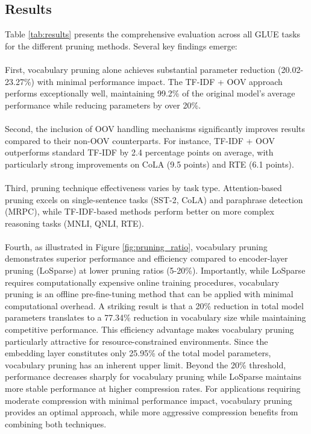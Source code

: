 \documentclass[twocolumn]{article}
\begin{document}
\subsection{Results}
Table \ref{tab:results} presents the comprehensive evaluation across all GLUE tasks for the different pruning methods. Several key findings emerge:
\\ \\
First, vocabulary pruning alone achieves substantial parameter reduction (20.02-23.27\%) with minimal performance impact. The TF-IDF + OOV approach performs exceptionally well, maintaining 99.2\% of the original model's average performance while reducing parameters by over 20\%.
\\ \\
Second, the inclusion of OOV handling mechanisms significantly improves results compared to their non-OOV counterparts. For instance, TF-IDF + OOV outperforms standard TF-IDF by 2.4 percentage points on average, with particularly strong improvements on CoLA (9.5 points) and RTE (6.1 points).
\\ \\
Third, pruning technique effectiveness varies by task type. Attention-based pruning excels on single-sentence tasks (SST-2, CoLA) and paraphrase detection (MRPC), while TF-IDF-based methods perform better on more complex reasoning tasks (MNLI, QNLI, RTE).
\\ \\
Fourth, as illustrated in Figure \ref{fig:pruning_ratio}, vocabulary pruning demonstrates superior performance and efficiency compared to encoder-layer pruning (LoSparse) at lower pruning ratios (5-20\%). Importantly, while LoSparse requires computationally expensive online training procedures, vocabulary pruning is an offline pre-fine-tuning method that can be applied with minimal computational overhead. A striking result is that a 20\% reduction in total model parameters translates to a 77.34\% reduction in vocabulary size while maintaining competitive performance. This efficiency advantage makes vocabulary pruning particularly attractive for resource-constrained environments. Since the embedding layer constitutes only 25.95\% of the total model parameters, vocabulary pruning has an inherent upper limit. Beyond the 20\% threshold, performance decreases sharply for vocabulary pruning while LoSparse maintains more stable performance at higher compression rates. For applications requiring moderate compression with minimal performance impact, vocabulary pruning provides an optimal approach, while more aggressive compression benefits from combining both techniques.
\end{document}
